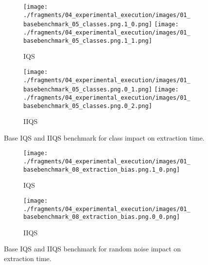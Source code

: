 \begin{figure}
    \centering
    \begin{subfigure}[b]{\textwidth}
        \centering
        \texttt{[image: ./fragments/04\_experimental\_execution/images/01\_basebenchmark\_05\_classes.png.1\_0.png]}
        \texttt{[image: ./fragments/04\_experimental\_execution/images/01\_basebenchmark\_05\_classes.png.1\_1.png]}
        \caption{IQS}
        \label{FIG:BENCHMARK_05_CLASSES__0_0}
    \end{subfigure}

    \begin{subfigure}[b]{\textwidth}
        \centering
        \texttt{[image: ./fragments/04\_experimental\_execution/images/01\_basebenchmark\_05\_classes.png.0\_1.png]}
        \texttt{[image: ./fragments/04\_experimental\_execution/images/01\_basebenchmark\_05\_classes.png.0\_2.png]}
        \caption{IIQS}
        \label{FIG:BENCHMARK_05_CLASSES__0_1}
    \end{subfigure}

    \caption{Base IQS and IIQS benchmark for class impact on extraction time.}
    \label{FIG:BENCHMARK_05_CLASSES}
\end{figure}

\begin{figure}
    \centering
    \begin{subfigure}[b]{0.45\textwidth}
        \centering
        \texttt{[image: ./fragments/04\_experimental\_execution/images/01\_basebenchmark\_08\_extraction\_bias.png.1\_0.png]}
        \caption{IQS}
        \label{FIG:BENCHMARK_05_CLASSES__1_0}
    \end{subfigure}
    \hfill
    \begin{subfigure}[b]{0.45\textwidth}
        \centering
        \texttt{[image: ./fragments/04\_experimental\_execution/images/01\_basebenchmark\_08\_extraction\_bias.png.0\_0.png]}
        \caption{IIQS}
        \label{FIG:BENCHMARK_05_CLASSES__1_1}
    \end{subfigure}

    \caption{Base IQS and IIQS benchmark for random noise impact on extraction time.}
    \label{FIG:BENCHMARK_05_CLASSES_1}
\end{figure}

